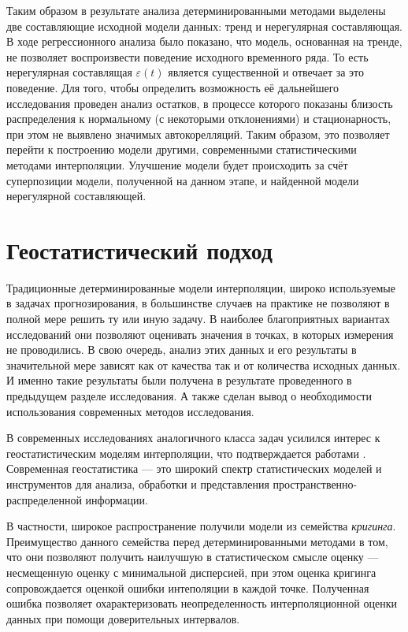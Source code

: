 Таким образом в результате анализа детерминированными методами выделены две составляющие исходной модели данных: тренд и нерегулярная составляющая. В ходе регрессионного анализа было показано, что модель, основанная на тренде, не позволяет воспроизвести поведение исходного временного ряда. То есть нерегулярная составлящая $ \varepsilon(t) $ является существенной и отвечает за это поведение. Для того, чтобы определить возможность её дальнейшего исследования проведен анализ остатков, в процессе которого показаны близость распределения к нормальному (с некоторыми отклонениями) и стационарность, при этом не выявлено значимых автокорелляций. Таким образом, это позволяет перейти к построению модели другими, современными статистическими методами интерполяции. Улучшение модели будет происходить за счёт суперпозиции модели, полученной на данном этапе, и найденной модели нерегулярной составляющей.



\section{Геостатистический подход} %
\label{sec:geostatistic}

Традиционные детерминированные модели интерполяции, широко используемые в задачах прогнозирования, в большинстве случаев на практике не позволяют в полной мере решить ту или иную задачу. В наиболее благоприятных вариантах исследований они позволяют оценивать значения в точках, в которых измерения не проводились. В свою очередь, анализ этих данных и его результаты в значительной мере зависят как от качества так и от количества исходных данных. И именно такие результаты были получена в результате проведенного в предыдущем разделе исследования. А также сделан вывод о необходимости использования современных методов исследования.

В современных исследованиях аналогичного класса задач усилился интерес к геостатистическим моделям интерполяции, что подтверждается работами \cite{GeoStCompar1987, GeoStCompar1998}. Современная геостатистика --- это широкий спектр статистических моделей и инструментов для анализа, обработки и представления пространственно-распределенной информации.

В частности, широкое распространение получили модели из семейства \textit{кригинга}. Преимущество данного семейства перед детерминированными методами в том, что они позволяют получить наилучшую в статистическом смысле оценку  --- несмещенную оценку с минимальной дисперсией, при этом оценка кригинга сопровождается оценкой ошибки интеполяции в каждой точке. Полученная ошибка позволяет охарактеризовать неопределенность интерполяционной оценки данных при помощи доверительных интервалов.

